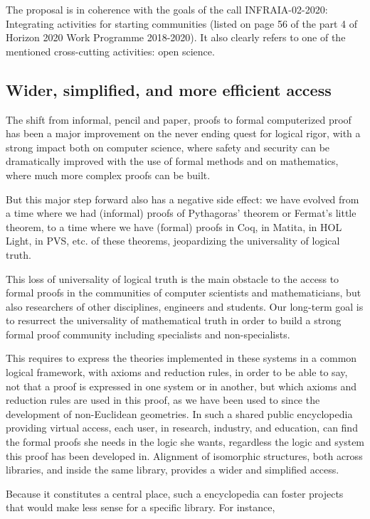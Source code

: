 The proposal is in coherence with the goals of the call INFRAIA-02-2020:
Integrating activities for starting communities (listed on page 56 of
the part 4 of Horizon 2020 Work Programme 2018-2020). It also clearly
refers to one of the mentioned cross-cutting activities: open science.

\subsection{Wider, simplified, and more efficient access}

The shift from informal, pencil and paper, proofs to formal
computerized proof has been a major improvement on the never ending
quest for logical rigor, with a strong impact both on computer
science, where safety and security can be dramatically improved with
the use of formal methods and on mathematics, where much more complex
proofs can be built.

But this major step forward also has a negative side effect: we have
evolved from a time where we had (informal) proofs of Pythagoras'
theorem or Fermat's little theorem, to a time where we have (formal)
proofs in {\sf Coq}, in {\sf Matita}, in {\sf HOL Light}, in {\sf
  PVS}, etc.  of these theorems, jeopardizing the universality of
logical truth.

This loss of universality of logical truth is the main obstacle to the
access to formal proofs in the communities of computer scientists and
mathematicians, but also researchers of other disciplines, engineers
and students.  Our long-term goal is to resurrect the universality of
mathematical truth in order to build a strong formal proof community
including specialists and non-specialists.

This requires to express the theories implemented in these systems in
a common logical framework, with axioms and reduction rules, in order
to be able to say, not that a proof is expressed in one system or in
another, but which axioms and reduction rules are used in this proof,
as we have been used to since the development of non-Euclidean
geometries. In such a shared public encyclopedia providing virtual
access, each user, in research, industry, and education, can find the
formal proofs she needs in the logic she wants, regardless the logic
and system this proof has been developed in.  Alignment of isomorphic
structures, both across libraries, and inside the same library,
provides a wider and simplified access.

Because it constitutes a central place, such a encyclopedia can foster
projects that would make less sense for a specific library. For instance,

